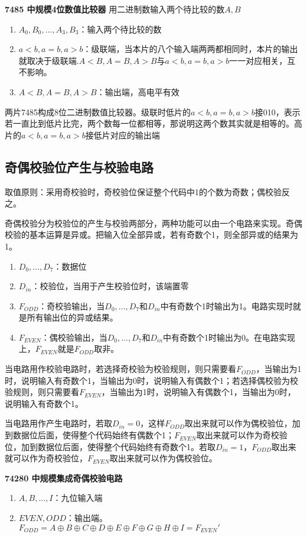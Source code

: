 \documentclass{ctexart}
\newcommand*{\noindbf}[1]{{\noindent \bf{#1} \qquad}}
\begin{document}
\noindbf{7485 中规模4位数值比较器}用二进制数输入两个待比较的数$A,B$
\begin{enumerate}
    \item $A_0,B_0,...,A_3,B_3$：输入两个待比较的数
    \item $a<b,a=b,a>b$：级联端，当本片的八个输入端两两都相同时，本片的输出就取决于级联端.$A<B,A=B,A>B$与$a<b,a=b,a>b$一一对应相关，互不影响。
    \item $A<B,A=B,A>B$：输出端，高电平有效
\end{enumerate}
两片7485构成8位二进制数值比较器。级联时低片的$a<b,a=b,a>b$接010，表示若一直比到低片比完，两个数每一位都相等，那说明这两个数其实就是相等的。高片的$a<b,a=b,a>b$接低片对应的输出端
\subsection{奇偶校验位产生与校验电路}
取值原则：采用奇校验时，奇校验位保证整个代码中1的个数为奇数；偶校验反之。

奇偶校验分为校验位的产生与校验两部分，两种功能可以由一个电路来实现。奇偶校验的基本运算是异或。把输入位全部异或，若有奇数个1，则全部异或的结果为1。
\begin{enumerate}
    \item $D_0,...,D_7$：数据位
    \item $D_{in}$：校验位，当用于产生校验位时，该端置零
    \item $F_{ODD}$：奇校验输出，当$D_0,...,D_7$和$D_{in}$中有奇数个1时输出为1。电路实现时就是所有输出位的异或结果。
    \item $F_{EVEN}$：偶校验输出，当$D_0,...,D_7$和$D_{in}$中有奇数个1时输出为0。在电路实现上，$F_{EVEN}$就是$F_{ODD}$取非。
\end{enumerate}
当电路用作校验电路时，若选择奇校验为校验规则，则只需要看$F_{ODD}$，当输出为1时，说明输入有奇数个1，当输出为0时，说明输入有偶数个1；若选择偶校验为校验规则，则只需要看$F_{EVEN}$，当输出为1时，说明输入有偶数个1，当输出为0时，说明输入有奇数个1。

当电路用作产生电路时，若取$D_{in}=0$，这样$F_{ODD}$取出来就可以作为偶校验位，加到数据位后面，使得整个代码始终有偶数个1；$F_{EVEN}$取出来就可以作为奇校验位，加到数据位后面，使得整个代码始终有奇数个1。若取$D_{in}=1$，$F_{ODD}$取出来就可以作为奇校验位，$F_{EVEN}$取出来就可以作为偶校验位。

\noindbf{74280 中规模集成奇偶校验电路}
\begin{enumerate}
    \item $A,B,...,I$：九位输入端
    \item $EVEN,ODD$：输出端。$F_{ODD}=A\oplus B\oplus C\oplus D\oplus E\oplus F\oplus G\oplus H\oplus I=F_{EVEN}'$
\end{enumerate}
\end{document}
